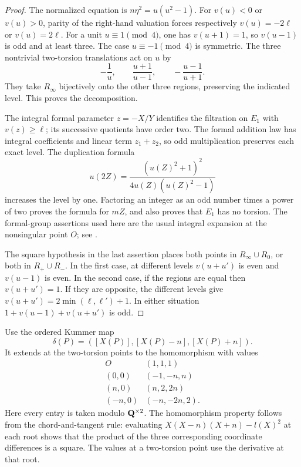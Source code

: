 \begin{proof}
The normalized equation is $n\eta^2=u(u^2-1)$.
For $v(u)<0$ or $v(u)>0$, parity of the right-hand valuation
forces respectively $v(u)=-2\ell$ or $v(u)=2\ell$.
For a unit $u\equiv1\pmod4$, one has $v(u+1)=1$, so
$v(u-1)$ is odd and at least three.  The case
$u\equiv-1\pmod4$ is symmetric.
The three nontrivial two-torsion translations act on $u$ by
\[
 -\frac1u,\qquad \frac{u+1}{u-1},\qquad
 -\frac{u-1}{u+1}.
\]
They take $R_\infty$ bijectively onto the other three regions,
preserving the indicated level.  This proves the decomposition.

The integral formal parameter $z=-X/Y$ identifies the filtration
on $E_1$ with $v(z)\geq\ell$; its successive quotients have order
two.  The formal addition law has integral coefficients and linear
term $z_1+z_2$, so odd multiplication preserves each exact level.
The duplication formula
\[
 u(2Z)=\frac{(u(Z)^2+1)^2}{4u(Z)(u(Z)^2-1)}
\]
increases the level by one.  Factoring an integer as an odd number
times a power of two proves the formula for $mZ$, and also proves
that $E_1$ has no torsion.  The formal-group assertions used here
are the usual integral expansion at the nonsingular point $O$;
see \cite[Chs.~IV and VII]{silverman2009}.

The square hypothesis in the last assertion places both points
in $R_\infty\cup R_0$, or both in $R_+\cup R_-$.
In the first case, at different levels $v(u+u')$ is even and
$v(u-1)$ is even.  In the second case, if the regions are equal
then $v(u+u')=1$.  If they are opposite, the different levels give
$v(u+u')=2\min(\ell,\ell')+1$.  In either situation
$1+v(u-1)+v(u+u')$ is odd.
\end{proof}

Use the ordered Kummer map
\[
 \delta(P)=([X(P)],[X(P)-n],[X(P)+n]).
\]
It extends at the two-torsion points to the homomorphism with values
\begin{equation}
\begin{array}{c|c}
O&(1,1,1)\\
(0,0)&(-1,-n,n)\\
(n,0)&(n,2,2n)\\
(-n,0)&(-n,-2n,2).
\end{array}
\label{eq:indp-torsion-kummer}
\end{equation}
Here every entry is taken modulo $\mathbf Q^{\times2}$.  The homomorphism
property follows from the chord-and-tangent rule: evaluating
$X(X-n)(X+n)-l(X)^2$ at each root shows that the product of the
three corresponding coordinate differences is a square.  The
values at a two-torsion point use the derivative at that root.

